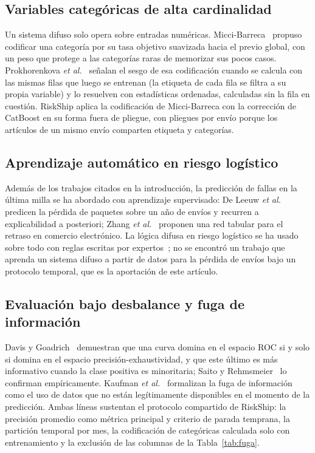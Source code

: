 \documentclass[conference]{IEEEtran}
\begin{document}
\subsection{Variables categóricas de alta cardinalidad}

Un sistema difuso solo opera sobre entradas numéricas. Micci-Barreca~\cite{micci}
propuso codificar una categoría por su tasa objetivo suavizada hacia el previo
global, con un peso que protege a las categorías raras de memorizar sus pocos
casos. Prokhorenkova \textit{et al.}~\cite{catboost} señalan el sesgo de esa
codificación cuando se calcula con las mismas filas que luego se entrenan (la
etiqueta de cada fila se filtra a su propia variable) y lo resuelven con
estadísticas ordenadas, calculadas sin la fila en cuestión. RiskShip aplica
la codificación de Micci-Barreca con la corrección de CatBoost en su forma
fuera de pliegue, con pliegues por envío porque los artículos de un mismo
envío comparten etiqueta y categorías.

\subsection{Aprendizaje automático en riesgo logístico}

Además de los trabajos citados en la introducción, la predicción de fallas en
la última milla se ha abordado con aprendizaje supervisado: De Leeuw
\textit{et al.}~\cite{deleeuw} predicen la pérdida de paquetes sobre un año
de envíos y recurren a explicabilidad a posteriori; Zhang
\textit{et al.}~\cite{zhang2026} proponen una red tabular para el retraso en
comercio electrónico. La lógica difusa en riesgo logístico se ha usado sobre
todo con reglas escritas por expertos~\cite{gajovic,aqlan}; no se encontró un
trabajo que aprenda un sistema difuso a partir de datos para la pérdida de
envíos bajo un protocolo temporal, que es la aportación de este artículo.

\subsection{Evaluación bajo desbalance y fuga de información}

Davis y Goadrich~\cite{davis} demuestran que una curva domina en el espacio
ROC si y solo si domina en el espacio precisión-exhaustividad, y que este
último es más informativo cuando la clase positiva es minoritaria; Saito y
Rehmsmeier~\cite{saito} lo confirman empíricamente. Kaufman
\textit{et al.}~\cite{kaufman} formalizan la fuga de información como el uso
de datos que no están legítimamente disponibles en el momento de la
predicción. Ambas líneas sustentan el protocolo compartido de RiskShip: la
precisión promedio como métrica principal y criterio de parada temprana, la
partición temporal por mes, la codificación de categóricas calculada solo con
entrenamiento y la exclusión de las columnas de la Tabla~\ref{tab:fuga}.
\end{document}
